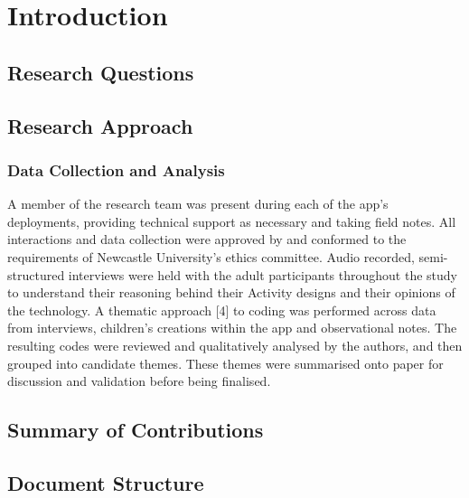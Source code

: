\chapter{Introduction}

\section{Research Questions}

\section{Research Approach}
\label{sec:ResearchApproach}

\subsection{Data Collection and Analysis}

A member of the research team was present during each of the app’s deployments, providing technical support as necessary and taking field notes. All interactions and data collection were approved by and conformed to the requirements of Newcastle University’s ethics committee. Audio recorded, semi-structured interviews were held with the adult participants throughout the study to understand their reasoning behind their Activity designs and their opinions of the technology. A thematic approach [4] to coding was performed across data from interviews, children’s creations within the app and observational notes. The resulting codes were reviewed and qualitatively analysed by the authors, and then grouped into candidate themes. These themes were summarised onto paper for discussion and validation before being finalised.

\section{Summary of Contributions}

\section{Document Structure}